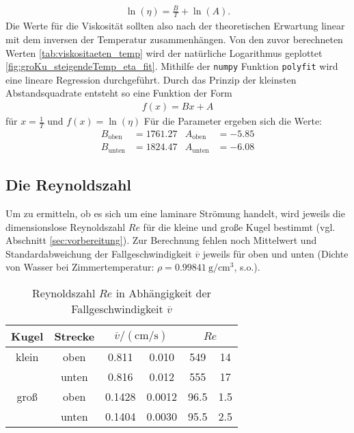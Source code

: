 \begin{align}
    \ln {\left( \eta \right)} = \frac{B}{T} + \ln{\left( A \right)}.
\end{align}
Die Werte für die Viskosität sollten also nach der theoretischen Erwartung linear mit dem inversen der Temperatur zusammenhängen.
Von den zuvor berechneten Werten \ref{tab:viskositaeten_temp} wird der natürliche Logarithmus geplottet \ref{fig:groKu_steigendeTemp_eta_fit}.
Mithilfe der \texttt{numpy} Funktion \texttt{polyfit} wird eine lineare Regression durchgeführt.
Durch das Prinzip der kleinsten Abstandsquadrate entsteht so eine Funktion der Form
\begin{align*}
    f(x) = B x + A 
\end{align*}
für $x= \frac{1}{T}$ und $f(x)= \ln (\eta)$
Für die Parameter ergeben sich die Werte:
\begin{align*}
    B_\text{oben} &= \num{1761.27} & A_\text{oben} &= \num{-5.85} \\
    B_\text{unten} &= \num{1824.47} & A_\text{unten} &= \num{-6.08}
\end{align*}


\subsection[]{Die Reynoldszahl}
Um zu ermitteln, ob es sich um eine laminare Strömung handelt, wird jeweils die dimensionslose Reynoldszahl $Re$ für die kleine und große Kugel bestimmt
(vgl. Abschnitt \ref{sec:vorbereitung}).
Zur Berechnung fehlen noch Mittelwert und Standardabweichung der Fallgeschwindigkeit $\overline{v}$ jeweils für oben und unten
(Dichte von Wasser bei Zimmertemperatur: $\rho = \qty{0.99841}{\g \per \cm^3}$, s.o.).

\begin{table}
    \caption[]{Reynoldszahl $Re$ in Abhängigkeit der Fallgeschwindigkeit $\overline{v}$}
    \label{tab:reynold}
    \centering
    \begin{tabular}[]{S S S[table-format=1.4] @{${}\pm{}$} S[table-format=1.4] S[table-format=4.1] @{${}\pm{}$} S[table-format=3.1]}
        \toprule
        {Kugel} & {Strecke} &  &  \\
        \bottomrule
        {klein} & {oben} & 0.811 & 0.010 & 549 & 14 \\
         & {unten} & 0.816 & 0.012 & 555 & 17 \\
        {groß} & {oben} & 0.1428 & 0.0012 & 96.5 & 1.5 \\
         & {unten} & 0.1404 & 0.0030 & 95.5 & 2.5 \\
    \end{tabular}
\end{table}


